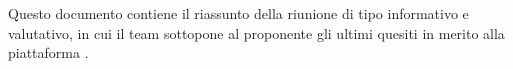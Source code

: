 Questo documento contiene il riassunto della riunione di tipo informativo e valutativo, in cui il team sottopone al proponente gli ultimi quesiti in merito alla piattaforma \progetto.
